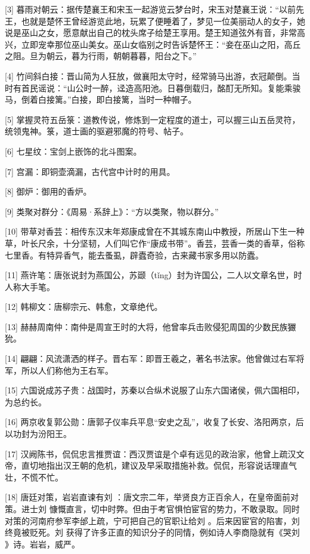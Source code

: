 \documentclass[12pt,UTF8]{ctexbook}
\begin{document}
[3] 暮雨对朝云：据传楚襄王和宋玉一起游览云梦台时，宋玉对楚襄王说：“以前先王，也就是楚怀王曾经游览此地，玩累了便睡着了，梦见一位美丽动人的女子，她说是巫山之女，愿意献出自己的枕头席子给楚王享用。楚王知道弦外有音，非常高兴，立即宠幸那位巫山美女。巫山女临别之时告诉楚怀王：“妾在巫山之阳，高丘之阻。旦为朝云，暮为行雨，朝朝暮暮，阳台之下。”

[4] 竹间斜白接：晋山简为人狂放，做襄阳太守时，经常骑马出游，衣冠颠倒。当时有首民谣说：“山公时一醉，迳造高阳池。日暮倒载归，酩酊无所知。复能乘骏马，倒着白接篱。”白接，即白接篱，当时一种帽子。

[5] 掌握灵符五岳箓：道教传说，修炼到一定程度的道士，可以握三山五岳灵符，统领鬼神。箓，道士画的驱避邪魔的符号、帖子。

[6] 七星纹：宝剑上嵌饰的北斗图案。

[7] 宫漏：即铜壶滴漏，古代宫中计时的用具。

[8] 御炉：御用的香炉。

[9] 类聚对群分：《周易·系辞上》：“方以类聚，物以群分。”

[10] 带草对香芸：相传东汉末年郑康成曾在不其城东南山中教授，所居山下生一种草，叶长尺余，十分坚韧，人们叫它作“康成书带”。香芸，芸香一类的香草，俗称七里香。有特异香气，能去蚤虱，辟蠹奇验，古来藏书家多用以防蠹。

[11] 燕许笔：唐张说封为燕国公，苏颋（tǐng）封为许国公，二人以文章名世，时人称大手笔。

[12] 韩柳文：唐柳宗元、韩愈，文章绝代。

[13] 赫赫周南仲：南仲是周宣王时的大将，他曾率兵击败侵犯周国的少数民族玁狁。

[14] 翩翩：风流潇洒的样子。晋右军：即晋王羲之，著名书法家。他曾做过右军将军，所以人们称他为王右军。

[15] 六国说成苏子贵：战国时，苏秦以合纵术说服了山东六国诸侯，佩六国相印，为总约长。

[16] 两京收复郭公勋：唐郭子仪率兵平息“安史之乱”，收复了长安、洛阳两京，后以功封为汾阳王。

[17] 汉阙陈书，侃侃忠言推贾谊：西汉贾谊是个卓有远见的政治家，他曾上疏汉文帝，直切地指出汉王朝的危机，建议及早采取措施补救。侃侃，形容说话理直气壮，不慌不忙。

[18] 唐廷对策，岩岩直谏有刘 ：唐文宗二年，举贤良方正百余人，在皇帝面前对策。进士刘 慷慨直言，切中时弊。但由于考官惧怕宦官的势力，不敢录取。同时对策的河南府参军李邰上疏，宁可把自己的官职让给刘 。后来因宦官的陷害，刘 终竟被贬死。刘 获得了许多正直的知识分子的同情，例如诗人李商隐就有《哭刘 》诗。岩岩，威严。
\end{document}
